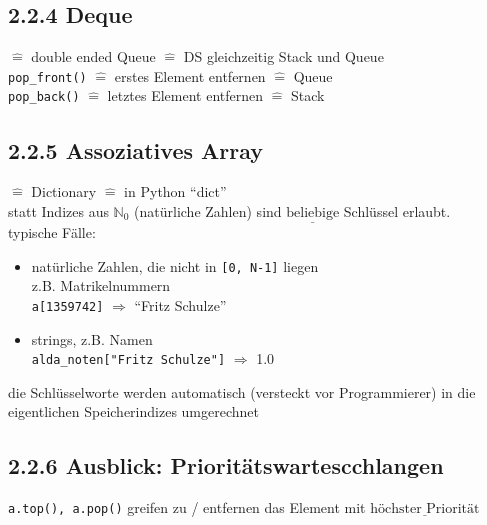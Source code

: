         \subsection*{2.2.4 Deque}
        $\widehat{=}$ double ended Queue $\widehat{=}$ DS gleichzeitig Stack und Queue \\

        \verb|pop_front()| $\widehat{=}$ erstes Element entfernen $\widehat{=}$ Queue \\
        \verb|pop_back()| $\widehat{=}$ letztes Element entfernen $\widehat{=}$ Stack \\

        \subsection*{2.2.5 Assoziatives Array}
        $\widehat{=}$ Dictionary $\widehat{=}$ in Python ``dict'' \\

        statt Indizes aus $\mathbb{N}_{0}$ (natürliche Zahlen) sind $\underline{\text{beliebige}}$ Schlüssel erlaubt. \\

        typische Fälle:
        \begin{itemize}[label={-}]
            \item natürliche Zahlen, die nicht in \verb|[0, N-1]| liegen \\
            z.B. Matrikelnummern \\
            \verb|a[1359742]| $\Rightarrow$ ``Fritz Schulze''
            \item strings, z.B. Namen \\
            \verb|alda_noten["Fritz Schulze"]| $\Rightarrow$ 1.0
        \end{itemize}
        die Schlüsselworte werden automatisch (versteckt vor Programmierer) in die eigentlichen Speicherindizes umgerechnet \\

        \subsection*{2.2.6 Ausblick: Prioritätswartescchlangen}
        \verb|a.top(), a.pop()| greifen zu / entfernen das Element mit $\underline{\text{höchster Priorität}}$\\

